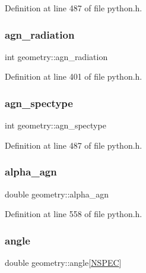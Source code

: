Definition at line 487 of file python.\+h.

\mbox{\label{structgeometry_a0be43d0c0f6fd83ef56702359de54512}} 
\subsubsection{\texorpdfstring{agn\+\_\+radiation}{agn\_radiation}}
{\footnotesize\ttfamily int geometry\+::agn\+\_\+radiation}



Definition at line 401 of file python.\+h.

\mbox{\label{structgeometry_af4e6a2e8c84eebc16bd93c17899c124f}} 
\subsubsection{\texorpdfstring{agn\+\_\+spectype}{agn\_spectype}}
{\footnotesize\ttfamily int geometry\+::agn\+\_\+spectype}



Definition at line 487 of file python.\+h.

\mbox{\label{structgeometry_a9a16f5c129fc954fd15b38e3cab8e12d}} 
\subsubsection{\texorpdfstring{alpha\+\_\+agn}{alpha\_agn}}
{\footnotesize\ttfamily double geometry\+::alpha\+\_\+agn}



Definition at line 558 of file python.\+h.

\mbox{\label{structgeometry_a47aa76b952a45aeef55a33feb4c2b531}} 
\subsubsection{\texorpdfstring{angle}{angle}}
{\footnotesize\ttfamily double geometry\+::angle\mbox{[}\hyperlink{python_8h_ade1df1cb82ae4ef9a5c0cddb37d9a73b}{N\+S\+P\+EC}\mbox{]}}



